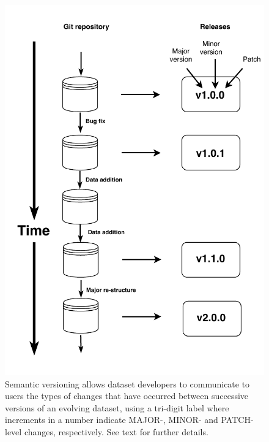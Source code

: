 \documentclass[a4paper,num-refs]{oup-contemporary}
\begin{document}
\begin{figure}[!t]
\centering
\includegraphics[width=\linewidth]{figures/Figure-versions.pdf}
\caption{
Semantic versioning allows dataset developers to communicate to users the types of changes that have occurred between successive versions of an evolving dataset, using a tri-digit label where increments in a number indicate MAJOR-, MINOR- and PATCH-level changes, respectively. See text for further details.}
\label{fig:semantic}
\end{figure}
\end{document}
